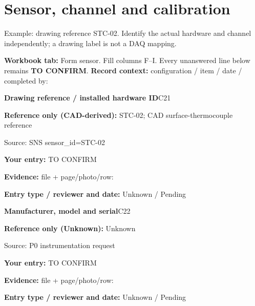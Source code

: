 \documentclass[11pt]{article}
\begin{document}
\clearpage\section{Sensor, channel and calibration}\label{form-sensor}
Example: drawing reference STC-02. Identify the actual hardware and channel independently; a drawing label is not a DAQ mapping.
\par\textbf{Workbook tab:} Form sensor. Fill columns F--I. Every unanswered line below remains \textbf{TO CONFIRM}.
\textbf{Record context:} configuration / item / date / completed by: \hrulefill\par
\par\noindent\begin{minipage}{\textwidth}\small
{\color{navy}\bfseries Drawing reference / installed hardware ID}\hfill C21\par
\colorbox{pale}{\parbox{\dimexpr\linewidth-2\fboxsep\relax}{
\textbf{Reference only (CAD-derived):} STC-02; CAD surface-thermocouple reference\par
{\footnotesize Source: SNS sensor\_\allowbreak{}id=STC-02}}}\par
\textbf{Your entry:} {\color{muted}TO CONFIRM}\enspace\hrulefill\par
{\footnotesize\textbf{Evidence:} file + page/photo/row: \hrulefill\par
\textbf{Entry type / reviewer and date:} Unknown / Pending\par
}\end{minipage}\par\vspace{5pt}
\par\noindent\begin{minipage}{\textwidth}\small
{\color{navy}\bfseries Manufacturer, model and serial}\hfill C22\par
\colorbox{pale}{\parbox{\dimexpr\linewidth-2\fboxsep\relax}{
\textbf{Reference only (Unknown):} Unknown\par
{\footnotesize Source: P0 instrumentation request}}}\par
\textbf{Your entry:} {\color{muted}TO CONFIRM}\enspace\hrulefill\par
{\footnotesize\textbf{Evidence:} file + page/photo/row: \hrulefill\par
\textbf{Entry type / reviewer and date:} Unknown / Pending\par
}\end{minipage}\par\vspace{5pt}
\end{document}
